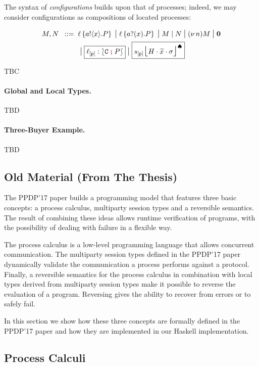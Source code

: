 \documentclass[runningheads,plain]{llncs}
\begin{document}
The syntax of \emph{configurations} builds upon that of processes; indeed, we may consider configurations as compositions of located processes:

\begin{align*}
M,N		 \bnfis &
\myloc{\loc}{\bout{a}{x}{P}}
\sbnfbar 
\myloc{\loc}{\binp{a}{x}{P}}
\sbnfbar 
M \Par N 
\sbnfbar 
\news{n} M
\sbnfbar 
\inact 
\\
& \sbnfbar 
\rtsyn{\np{\ep{\loc}{\p}}{\conf{\stack C}{P}}} %
\sbnfbar 
\rtsyn{\monig{\ep{s}{\p}}{H}{\mytilde{x}}{\store}}  %
\end{align*}

TBC

\paragraph{Global and Local Types.}
TBD

\paragraph{Three-Buyer Example.}
TBD

\subsection{Old Material (From The Thesis)}
The PPDP'17 paper builds a programming model that features three basic
concepts: a process calculus, multiparty session types and a reversible
semantics. The result of combining these ideas allows runtime
verification of programs, with the possibility of dealing with failure
in a flexible way.

The process calculus is a low-level programming language that allows
concurrent communication. The multiparty session types defined in the
PPDP'17 paper dynamically validate the communication a process performs
against a protocol. Finally, a reversible semantics for the process
calculus in combination with local types derived from multiparty session
types make it possible to reverse the evaluation of a program. Reversing
gives the ability to recover from errors or to safely fail.

In this section we show how these three concepts are formally defined in
the PPDP'17 paper and how they are implemented in our Haskell
implementation.

\subsection{Process Calculi}\label{process-calculi}
\end{document}
